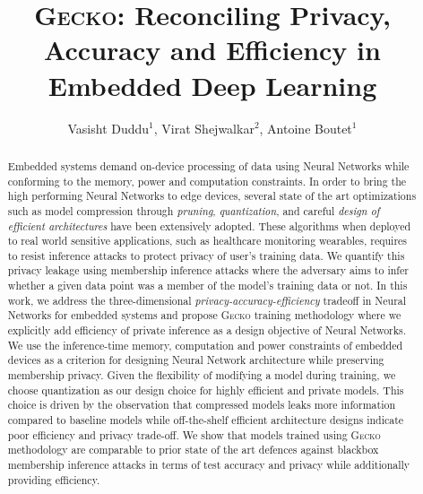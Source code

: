 \documentclass[sigconf]{acmart}
\newcommand{\method}{{\scshape Gecko}}
\begin{document}
\title{\method: Reconciling Privacy, Accuracy and Efficiency in Embedded Deep Learning}

\author{Vasisht Duddu$^1$, Virat Shejwalkar$^2$, Antoine Boutet$^1$}


\begin{abstract}
Embedded systems demand on-device processing of data using Neural Networks while conforming to the memory, power and computation constraints.
In order to bring the high performing Neural Networks to edge devices, several state of the art optimizations such as model compression through \textit{pruning}, \textit{quantization}, and careful \textit{design of efficient architectures} have been extensively adopted.
These algorithms when deployed to real world sensitive applications, such as healthcare monitoring wearables, requires to resist inference attacks to protect privacy of user's training data.
We quantify this privacy leakage using membership inference attacks where the adversary aims to infer whether a given data point was a member of the model's training data or not.
In this work, we address the three-dimensional \textit{privacy-accuracy-efficiency} tradeoff in Neural Networks for embedded systems and propose \method\hspace{0.02in} training methodology where we explicitly add efficiency of private inference as a design objective of Neural Networks.
We use the inference-time memory, computation and power constraints of embedded devices as a criterion for designing Neural Network architecture while preserving membership privacy.
Given the flexibility of modifying a model during training, we choose quantization as our design choice for highly efficient and private models.
This choice is driven by the observation that compressed models leaks more information compared to baseline models while off-the-shelf efficient architecture designs indicate poor efficiency and privacy trade-off.
We show that models trained using \method\hspace{0.02in} methodology are comparable to prior state of the art defences against blackbox membership inference attacks in terms of test accuracy and privacy while additionally providing efficiency.
\end{abstract}

\maketitle











%
%



\end{document}
